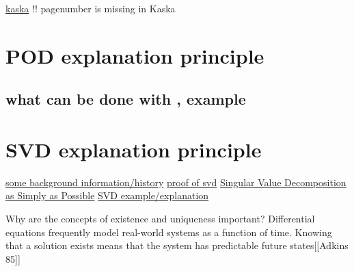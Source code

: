 \documentclass{scrartcl}
\begin{document}
\cite[]{kaska2019optimalizace}
\href{https://dspace5.zcu.cz/handle/11025/38222}{kaska}
\alert{!! pagenumber is missing in Kaska}
\cite[p62+]{gottlieb1997practical}


\section{POD explanation principle}
\cite[p595++]{bellam2021parametric}
\cite[p4+]{ribau2021flow}
\subsection{what can be done with \Comsol{} \Agros, example}


\section{SVD explanation principle}
\href{https://www.math.ucdavis.edu/~saito/courses/229A/stewart-svd.pdf}{some background information/history}
\href{https://gregorygundersen.com/blog/2018/12/20/svd-proof/}{proof of svd}
\href{https://gregorygundersen.com/blog/2018/12/10/svd/}{Singular Value Decomposition as Simply as Possible}
\href{https://www.igpm.rwth-aachen.de/Download/ss14/mor/ROM_L10_SS2014.pdf}{SVD example/explanation}

 Why are the concepts of existence and uniqueness important? Differential equations frequently model real-world systems as a function of time. Knowing that a solution exists means that the system has predictable future states[[Adkins 85]]
\end{document}
